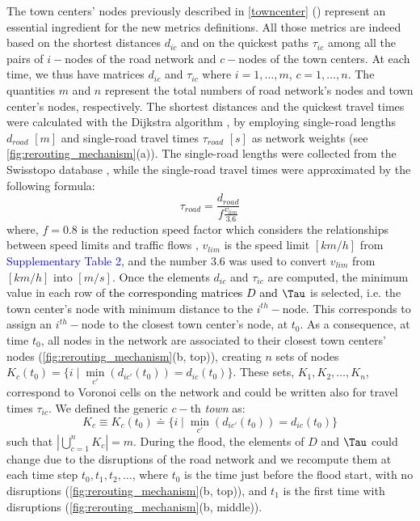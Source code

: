 \documentclass[twocolumn,fleqn,10pt]{wlscirep}
\begin{document}
The town centers' nodes previously described in \cref{towncenter} () represent an essential ingredient for the new metrics definitions. All those metrics are indeed based on the shortest distances $d_{ic}$ and on the quickest paths $\tau_{ic}$ among all the pairs of $i-$nodes of the road network and $c-$nodes of the town centers. At each time, we thus have matrices $d_{ic}$ and $\tau_{ic}$ where $i = 1,\dots,m$, $c = 1,\dots,n$. The quantities $m$ and $n$ represent the total numbers of road network's nodes and town center's nodes, respectively. 
%
The shortest distances and the quickest travel times were calculated with the Dijkstra algorithm \cite{Dijkstra}, by employing single-road lengths $d_{road}$ $[m]$ and single-road travel times $\tau_{road}$ $[s]$ as network weights (see \cref{fig:rerouting_mechanism}(a)). The single-road lengths were collected from the Swisstopo database \cite{Swisstopo}, while the single-road travel times were approximated by the following formula:
\begin{equation}
    \tau_{road} = \frac{d_{road}}{f \frac{v_{lim}}{3.6}}
    \label{tauroad}
\end{equation}
where, $f=0.8$ is the reduction speed factor which considers the relationships between speed limits and traffic flows \citep{Gao2019}, $v_{lim}$ is the speed limit $[km/h]$ from 
\textcolor{blue}{Supplementary Table 2},
and the number $3.6$ was used to convert $v_{lim}$ from $[km/h]$ into $[m/s]$.
Once the elements $d_{ic}$ and $\tau_{ic}$ are computed, the minimum value in each row of
\textcolor{black}{the corresponding matrices $D$ and $\Tau$}
is selected, i.e. the town center's node with minimum distance to the $i^{th}-$node. This corresponds to assign an $i^{th}-$node to the closest town center's node, at $t_0$. As a consequence, at time $t_0$, all nodes in the network are associated to their closest town centers' nodes (\cref{fig:rerouting_mechanism}(b, top)), creating $n$ sets of nodes
$K_c(t_0) = \{ i \mid \min\limits_{c'} (d_{i c'} (t_0)) = d_{ic} (t_0) \}$. These sets, $K_1,K_2,\dots,K_n$, correspond to Voronoi cells on the network and could be written also for travel times $\tau_{i c}$. We defined the generic $c-$th \emph{town} as:
\begin{equation}
    K_c \equiv K_c(t_0) \doteq \{ i \mid \min\limits_{c'} (d_{i c'} (t_0)) = d_{ic} (t_0) \}
    \label{K_c}
\end{equation}
such that $|\bigcup_{c=1}^{n} K_{c}| = m$. During the flood, the elements of $D$ and $\Tau$ could change due to the disruptions of the road network and we recompute them at each time step $t_0,t_1, t_2,\dots$, where $t_0$ is the time just before the flood start, with no disruptions (\cref{fig:rerouting_mechanism}(b, top)), and $t_1$ is the first time with disruptions (\cref{fig:rerouting_mechanism}(b, middle)). 
\end{document}
